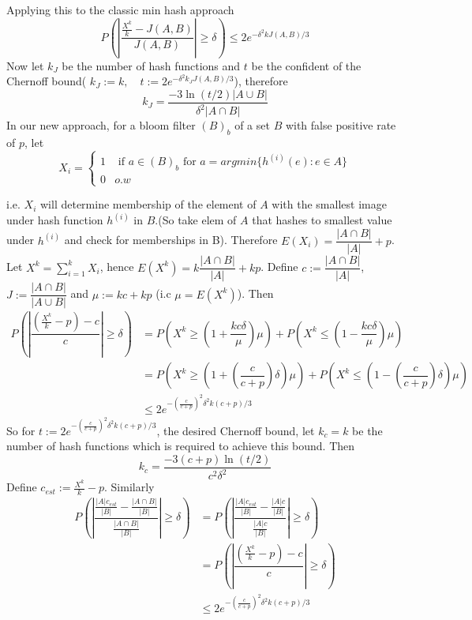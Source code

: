 \documentclass[11pt]{amsart}
\theoremstyle{remark}
\numberwithin{equation}{section}
\begin{document}
Applying this to the classic min hash approach
$$P\left( \left|\dfrac{\frac{X^k}{k}-J(A,B)}{J(A,B)}\right|\geq\delta\right)\leq 2e^{-\delta^2kJ(A,B)/3}$$
Now let $k_J$ be the number of hash functions and $t$ be the confident of the Chernoff bound( $k_J:=k,\quad t:=2e^{-\delta^2k_JJ(A,B)/3}$), therefore
$$k_J=\dfrac{-3\ln(t/2)|A\cup B|}{\delta^2 |A\cap B|}$$
In our new approach, for a bloom filter $(B)_b$ of a set $B$ with false positive rate of $p$, let 
$$X_i=\left\{
\begin{array}{ll}
1&\text{ if } a\in(B)_b\text{ for } a=argmin\{h^{(i)}{(e)}:e\in A\}\\
0& o.w
\end{array}
\right.$$

i.e. $X_i$ will determine membership of the element of $A$ with the smallest image under hash function $h^{(i)}$ in $B$.(So take elem of $A$ that hashes to smallest value under $h^{(i)}$ and check for memberships in B). Therefore $E(X_i)=\dfrac{|A\cap B|}{|A|}+p$. Let 
$X^k=\sum\limits_{i=1}^k X_i$, hence $ E(X^k)=k\dfrac{|A\cap B|}{|A|}+kp$. Define 
$c:= \dfrac{|A\cap B|}{|A|}$,  $J:= \dfrac{|A\cap B|}{|A\cup B|} $ and
$\mu:=k c+k p$ (i.c $\mu=E(X^k)$). Then
\begin{align*}
P\left(
\left|\dfrac{\left(\frac{X^k}{k}-p\right)-c}{c}\right|\geq \delta\right)
&=P\left(X^k\geq\left(1+\dfrac{kc\delta}{\mu}\right)\mu\right) +P\left(X^k\leq \left(1-\dfrac{kc\delta}{\mu}\right)\mu\right)\\
&=P\left( X^k\geq\left( 1+\left(\dfrac{c}{c+p}\right)\delta\right)\mu\right) + P\left(X^k\leq\left(1-\left(\dfrac{c}{c+p}\right)\delta\right)\mu\right)\\
&\leq 2e^{-\left(\frac{c}{c+p}\right)^2\delta^2k(c+p)/3}
\end{align*}
So for $t:=2e^{-\left(\frac{c}{c+p}\right)^2\delta^2k(c+p)/3}$, the desired Chernoff bound, let $k_c=k$ be the number of hash functions which is required to achieve this bound. Then 
$$k_c=\dfrac{-3(c+p)\ln(t/2)}{c^2\delta^2}$$
Define $c_{est}:=\frac{X^k}{k}-p$. Similarly 
\begin{align*}
 P\left(
\left|\dfrac{\frac{|A|c_{est}}{|B|}-\frac{|A\cap B|}{|B|}}{\frac{|A\cap B|}{|B|}}\right|\geq \delta\right)
&=P\left(
\left|\dfrac{\frac{|A|c_{est}}{|B|}-\frac{|A|c}{|B|}}{\frac{|A|c}{|B|}}\right|\geq \delta\right)\\
&=P\left(
\left|\dfrac{\left(\frac{X^k}{k}-p\right)-c}{c}\right|\geq \delta\right)\\
&\leq 2e^{-\left(\frac{c}{c+p}\right)^2\delta^2k(c+p)/3}
\end{align*}
\end{document}
